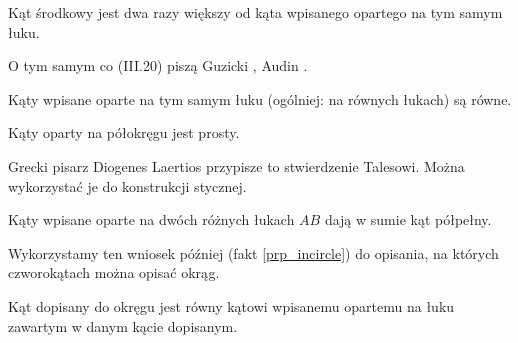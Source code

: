 
\begin{proposition}
    Kąt środkowy jest dwa razy większy od kąta wpisanego opartego na tym samym łuku.
\end{proposition}

O tym samym co (III.20) piszą Guzicki \cite[s. 11-13]{guzicki_2021}, Audin \cite[s. 74, 75]{audin_2003}.

\begin{corollary}
    Kąty wpisane oparte na tym samym łuku (ogólniej: na równych łukach) są równe.
\end{corollary}

\begin{corollary}
    Kąty oparty na półokręgu jest prosty.
\end{corollary}

Grecki pisarz Diogenes Laertios przypisze to stwierdzenie Talesowi.
%
%
Można wykorzystać je do konstrukcji stycznej.
%

\begin{corollary}
    \label{ab_twice_pi}
    Kąty wpisane oparte na dwóch różnych łukach $AB$ dają w sumie kąt półpełny.
\end{corollary}

Wykorzystamy ten wniosek później (fakt \ref{prp_incircle}) do opisania, na których czworokątach można opisać okrąg.

\begin{proposition}
    Kąt dopisany do okręgu jest równy kątowi wpisanemu opartemu na łuku zawartym w danym kącie dopisanym.
\end{proposition}

